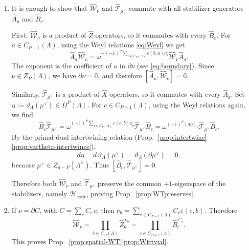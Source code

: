 \begin{enumerate}
	\item It is enough to show that \(\hat{\mathcal W}_\nu\) and
	\(\hat{\mathcal T}_{\mu^\vee}\) commute with all stabilizer generators
	\(\hat A_a\) and \(\hat B_c\).
	
	First, \(\hat{\mathcal W}_\nu\) is a product of \(\hat Z\)-operators, so it commutes
	with every \(\hat B_c\). For \(a\in C_{P-1}(\Lambda)\), using the Weyl relations \eqref{eq:Weyl} we get
	\begin{equation}
		\hat A_a\hat{\mathcal W}_\nu
		=
		\omega^{-(-1)^P\sum_{b\in C_P(\Lambda)}
			\varepsilon(b,a)\nu_b}
		\hat{\mathcal W}_\nu\hat A_a .
	\end{equation}
	The exponent is the coefficient of \(a\) in \(\partial\nu\) (see \eqref{eq:boundary}). Since
	\(\nu\in Z_P(\Lambda)\), we have \(\partial\nu=0\), and therefore $[\hat A_a,\hat{\mathcal W}_\nu]=0$.
	
	Similarly, \(\hat{\mathcal T}_{\mu^\vee}\) is a product of \(\hat X\)-operators, so it
	commutes with every \(\hat A_a\). Set $\eta:=\vartheta_\Lambda(\mu^\vee)\in \Omega^P(\Lambda)$. For \(c\in C_{P+1}(\Lambda)\), using the Weyl relations again, we find
	\begin{equation}
		\hat B_c\hat{\mathcal T}_{\mu^\vee}
		=
		\omega^{(-1)^P\sum_{b\in C_P(\Lambda)}
			\varepsilon(c,b)\eta_b}
		\hat{\mathcal T}_{\mu^\vee}\hat B_c
		=
		\omega^{(-1)^P(d\eta)_c}
		\hat{\mathcal T}_{\mu^\vee}\hat B_c .
	\end{equation}
	By the primal-dual intertwining relation (Prop.~\ref{prop:intertwine}\ref{prop:vartheta-intertwines}),
	\begin{equation}
		d\eta
		=
		d\,\vartheta_\Lambda(\mu^\vee)
		=
		\vartheta_\Lambda(\partial\mu^\vee)
		=
		0,
	\end{equation}
	because \(\mu^\vee\in Z_{d-P}(\Lambda^\vee)\). Thus $[\hat B_c,\hat{\mathcal T}_{\mu^\vee}]=0$.
	
	Therefore both \(\hat{\mathcal W}_\nu\) and \(\hat{\mathcal T}_{\mu^\vee}\) preserve the
	common \(+1\)-eigenspace of the stabilizers, namely
	\(\mathcal H_{\mathrm{code}}\), proving Prop.~\ref{prop:WTpreserves}.
	
	\item If \(\nu=\partial C\), with \(C=\sum_c C_c\,c\), then
	$
	\nu_b
	=
	\sum_{c\in C_{P+1}(\Lambda)}C_c\varepsilon(c,b)
	$.
	Therefore
	\begin{equation}
		\hat{\mathcal W}_\nu
		=
		\prod_{b\in C_P(\Lambda)}\hat Z_b^{\,\nu_b}
		=
		\prod_{c\in C_{P+1}(\Lambda)}\hat B_c^{\,C_c}.
	\end{equation}
	This proves Prop.~\ref{prop:spatial-WT}\ref{prop:Wtrivial}.
	

\end{enumerate}
